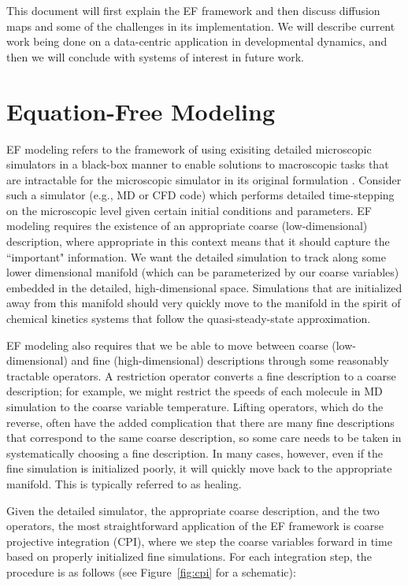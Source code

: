 \documentclass[12pt]{article}
\begin{document}
This document will first explain the EF framework and then discuss diffusion maps and some of the challenges in its implementation. We will describe current work being done on a data-centric application in developmental dynamics, and then we will conclude with systems of interest in future work.  \vspace{1mm}

\section{Equation-Free Modeling}

EF modeling refers to the framework of using exisiting detailed microscopic simulators in a black-box manner to enable solutions to macroscopic tasks that are intractable for the microscopic simulator in its original formulation \cite{Siettos2003, Kevrekidis2003, Kevrekidis2004}. Consider such a simulator (e.g., MD or CFD code) which performs detailed time-stepping on the microscopic level given certain initial conditions and parameters. EF modeling requires the existence of an appropriate coarse (low-dimensional) description, where appropriate in this context means that it should capture the ``important" information. We want the detailed simulation to track along some lower dimensional manifold (which can be parameterized by our coarse variables) embedded in the detailed, high-dimensional space. Simulations that are initialized away from this manifold should very quickly move to the manifold in the spirit of chemical kinetics systems that follow the quasi-steady-state approximation. \vspace{1mm}

EF modeling also requires that we be able to move between coarse (low-dimensional) and fine (high-dimensional) descriptions through some reasonably tractable operators. A restriction operator converts a fine description to a coarse description; for example, we might restrict the speeds of each molecule in MD simulation to the coarse variable temperature. Lifting operators, which do the reverse, often have the added complication that there are many fine descriptions that correspond to the same coarse description, so some care needs to be taken in systematically choosing a fine description. In many cases, however, even if the fine simulation is initialized poorly, it will quickly move back to the appropriate manifold. This is typically referred to as healing. \vspace{1mm}

Given the detailed simulator, the appropriate coarse description, and the two operators, the most straightforward application of the EF framework is coarse projective integration (CPI), where we step the coarse variables forward in time based on properly initialized fine simulations. For each integration step, the procedure is as follows (see Figure~\ref{fig:cpi} for a schematic):  \vspace{1mm}
\end{document}
